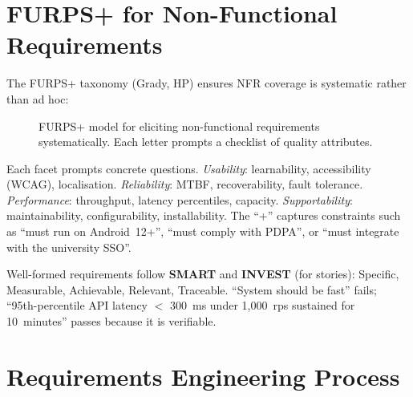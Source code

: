 \section{FURPS+ for Non-Functional Requirements}

The FURPS+ taxonomy (Grady, HP) ensures NFR coverage is systematic rather than ad hoc:

\begin{figure}[h]
\centering
{}
\caption{FURPS+ model for eliciting non-functional requirements systematically. Each letter prompts a checklist of quality attributes.}
\end{figure}

Each facet prompts concrete questions. \emph{Usability}: learnability, accessibility (WCAG), localisation. \emph{Reliability}: MTBF, recoverability, fault tolerance. \emph{Performance}: throughput, latency percentiles, capacity. \emph{Supportability}: maintainability, configurability, installability. The ``+'' captures constraints such as ``must run on Android~12+'', ``must comply with PDPA'', or ``must integrate with the university SSO''.

Well-formed requirements follow \textbf{SMART} and \textbf{INVEST} (for stories): Specific, Measurable, Achievable, Relevant, Traceable. ``System should be fast'' fails; ``95th-percentile API latency $<$ 300~ms under 1{,}000~rps sustained for 10~minutes'' passes because it is verifiable.

\section{Requirements Engineering Process}

